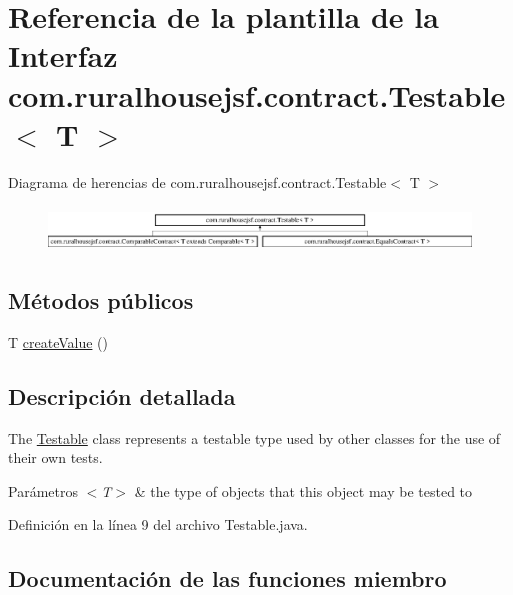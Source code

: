 \hypertarget{interfacecom_1_1ruralhousejsf_1_1contract_1_1_testable}{}\section{Referencia de la plantilla de la Interfaz com.\+ruralhousejsf.\+contract.\+Testable$<$ T $>$}
\label{interfacecom_1_1ruralhousejsf_1_1contract_1_1_testable}
Diagrama de herencias de com.\+ruralhousejsf.\+contract.\+Testable$<$ T $>$\begin{figure}[H]
\begin{center}
\leavevmode
\includegraphics[height=1.212121cm]{interfacecom_1_1ruralhousejsf_1_1contract_1_1_testable}
\end{center}
\end{figure}
\subsection*{Métodos públicos}
\begin{DoxyCompactItemize}
\item 
T \mbox{\hyperlink{interfacecom_1_1ruralhousejsf_1_1contract_1_1_testable_ae4546a381488faaba1ef7c0f8688de9c}{create\+Value}} ()
\end{DoxyCompactItemize}


\subsection{Descripción detallada}
The \mbox{\hyperlink{interfacecom_1_1ruralhousejsf_1_1contract_1_1_testable}{Testable}} class represents a testable type used by other classes for the use of their own tests.


\begin{DoxyParams}{Parámetros}
{\em $<$\+T$>$} & the type of objects that this object may be tested to \\
\hline
\end{DoxyParams}


Definición en la línea 9 del archivo Testable.\+java.



\subsection{Documentación de las funciones miembro}
\mbox{\label{interfacecom_1_1ruralhousejsf_1_1contract_1_1_testable_ae4546a381488faaba1ef7c0f8688de9c}} 
